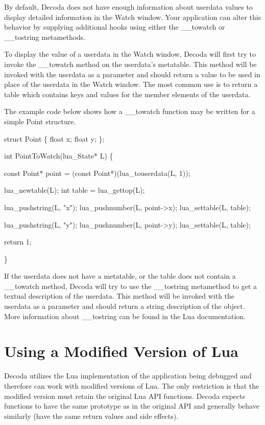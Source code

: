 By default, Decoda does not have enough information about userdata values to display detailed information
in the Watch window.  Your application can alter this behavior by supplying additional hooks using either the 
__towatch or __tostring metamethods.

To display the value of a userdata in the Watch window, Decoda will first try to invoke the __towatch method
on the userdata's metatable. This method will be invoked with the userdata as a parameter and should return a
value to be used in place of the userdata in the Watch window.  The most common use is to return a table which
contains keys and values for the member elements of the userdata.

The example code below shows how a __towatch function may be written for a simple Point structure.

{\verbatim struct Point
\{
	float x;
	float y;
\};

int PointToWatch(lua_State* L)
\{

	const Point* point = (const Point*)(lua_touserdata(L, 1));

	lua_newtable(L);
	int table = lua_gettop(L);
	
	lua_pushstring(L, "x");
	lua_pushnumber(L, point->x);
	lua_settable(L, table);

	lua_pushstring(L, "y");
	lua_pushnumber(L, point->y);
	lua_settable(L, table);
	
	return 1;
	
\} }


If the userdata does not have a metatable, or the table does not contain a __towatch method, Decoda will try
to use the __tostring metamethod to get a textual description of the userdata.  This method will be invoked
with the userdata as a parameter and should return a string description of the object.  More information about
__tostring can be found in the Lua documentation.

\section{Using a Modified Version of Lua}\label{modified_lua}

Decoda utilizes the Lua implementation of the application being debugged and therefore can work with modified
versions of Lua. The only restriction is that the modified version must retain the original Lua API functions.
Decoda expects functions to have the same prototype as in the original API and generally behave similarly (have
the same return values and side effects).

